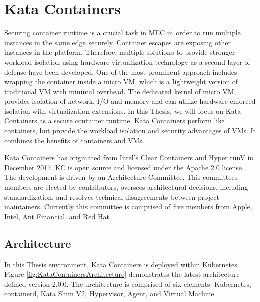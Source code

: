 \chapter{Kata Containers}
\label{chapter:katacontainers}

Securing container runtime is a crucial task in MEC in order to run multiple instances in the same edge securely. Container escapes are exposing other instances in the platform. Therefore, multiple solutions to provide stronger workload isolation using hardware virtualization technology as a second layer of defense have been developed. One of the most prominent approach includes wrapping the container inside a micro VM, which is a lightweight version of traditional VM with minimal overhead. The dedicated kernel of micro VM, provides isolation of network, I/O and memory and can utilize hardware-enforced isolation with virtualization extensions. In this Thesis, we will focus on Kata Containers as a secure container runtime. Kata Containers perform like containers, but provide the workload isolation and security advantages of VMs. It combines the benefits of containers and VMs. \cite{KataContainers}

Kata Containers has originated from Intel's Clear Containers \cite{ClearContainers} and Hyper runV \cite{runV} in December 2017. KC is open source and licensed under the Apache 2.0 license. The development is driven by an Architecture Committee. This committees members are elected by contributors, oversees architectural decisions, including standardization, and resolves technical disagreements between project maintainers. Currently this committee is comprised of five members from Apple, Intel, Ant Financial, and Red Hat. \cite{KataContainersGovernance} \cite{KataContainers}

\section{Architecture}

In this Thesis environment, Kata Containers is deployed within Kubernetes. Figure \ref{fig:KataContainersArchitecture} demonstrates the latest architecture defined version 2.0.0. The architecture is comprised of six elements: Kubernetes, containerd, Kata Shim V2, Hypervisor, Agent, and Virtual Machine.

